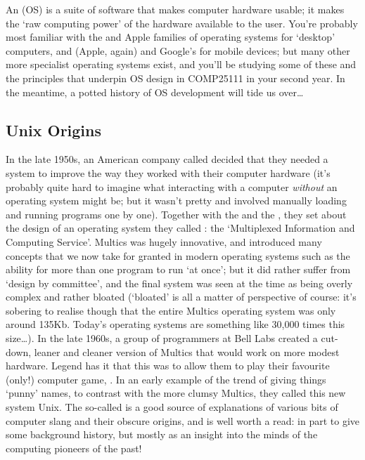 An  (OS) is a suite of
software that makes computer hardware usable; it makes the `raw
computing power' of the hardware available to the user. You're
probably most familiar with
the  and
Apple  families of operating systems for
`desktop' computers, and  (Apple, again) and
Google's  for mobile
devices; but many other more specialist operating systems exist, and
you'll be studying some of these and the principles that underpin OS
design in COMP25111 in your second year. In the meantime, a potted
history of OS development will tide us over\ldots

\subsection{Unix Origins}
\label{sec:unix}

In the late 1950s, an American company
called  decided that they
needed a system to improve the way they worked with their computer
hardware (it's probably quite hard to imagine what interacting with a
computer \emph{without} an operating system might be; but it wasn't
pretty and involved manually loading and running programs one by
one). Together with the  and the , they set about the design of an operating system they
called : the `Multiplexed Information and
Computing Service'. Multics was hugely innovative, and introduced many
concepts that we now take for granted in modern operating systems such
as the ability for more than one program to run `at once'; but it did
rather suffer from `design by committee', and the final system was
seen at the time as being overly complex and rather bloated (`bloated'
is all a matter of perspective of course: it's sobering to realise
though that the entire Multics operating system was only around
135Kb. Today's operating systems are something like 30,000 times this
size\ldots). In the late 1960s, a group of programmers at Bell Labs
created a cut-down, leaner and cleaner version of Multics that would
work on more modest hardware. Legend has it that this was to allow
them to play their favourite (only!) computer
game, . In an early
example of the trend of giving things `punny' names, to contrast with
the more clumsy Multics, they called this new system Unix. The
so-called  is a good source of
explanations of various bits of computer slang and their obscure
origins, and is well worth a read: in part to give some background
history, but mostly as an insight into the minds of the computing
pioneers of the past!

